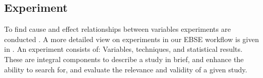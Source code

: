 \subsection{Experiment}

To find cause and effect relationships between variables experiments are conducted \cite{BuddiesVariables}. A more detailed view on experiments in our EBSE workflow  is given in . An experiment consists of: Variables, techniques, and statistical results. These are integral components to describe a study in brief, and enhance the ability to search for, and evaluate the relevance and validity of a given study.